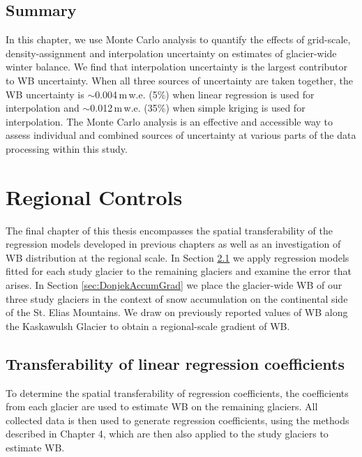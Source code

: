 \documentclass{sfuthesis}
\begin{document}
\section{Summary}

In this chapter, we use Monte Carlo analysis to quantify the effects of grid-scale, density-assignment and interpolation uncertainty on estimates of glacier-wide winter balance. We find that interpolation uncertainty is the largest contributor to WB uncertainty. When all three sources of uncertainty are taken together, the WB uncertainty is $\sim$0.004\,m\,w.e. (5\%) when linear regression is used for interpolation and $\sim$0.012\,m\,w.e. (35\%) when simple kriging is used for interpolation. The Monte Carlo analysis is an effective and accessible way to assess individual and combined sources of uncertainty at various parts of the data processing within this study.




\chapter{Regional Controls}
\label{sec:RegionalControls}

The final chapter of this thesis encompasses the spatial transferability of the regression models developed in previous chapters as well as an investigation of WB distribution at the regional scale. In Section \ref{sec:transferability} we apply regression models fitted for each study glacier to the remaining glaciers and examine the error that arises. In Section \ref{sec:DonjekAccumGrad} we place the glacier-wide WB of our three study glaciers in the context of snow accumulation on the continental side of the St. Elias Mountains. We draw on previously reported values of WB along the Kaskawulsh Glacier to obtain a regional-scale gradient of WB.


\section{Transferability of linear regression coefficients}
\label{sec:transferability}

To determine the spatial transferability of regression coefficients, the coefficients from each glacier are used to estimate WB on the remaining glaciers. All collected data is then used to generate regression coefficients, using the methods described in Chapter 4, which are then also applied to the study glaciers to estimate WB. 
\end{document}

